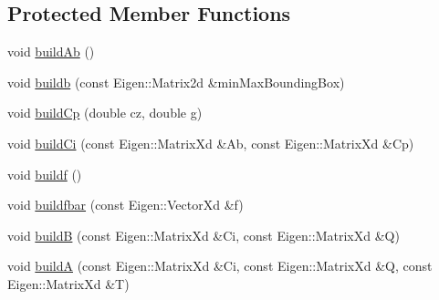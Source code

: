 \subsection*{\-Protected \-Member \-Functions}
\begin{DoxyCompactItemize}
\item 
void \hyperlink{classBaseOfSupport_a70bb139aba387291e0180458a53fb8e5}{build\-Ab} ()
\item 
void \hyperlink{classBaseOfSupport_a2a506dc1978a2f4ff459d521733b4367}{buildb} (const \-Eigen\-::\-Matrix2d \&min\-Max\-Bounding\-Box)
\item 
void \hyperlink{classBaseOfSupport_a7efc6cad789632e88d8c85ab171a9eef}{build\-Cp} (double cz, double g)
\item 
void \hyperlink{classBaseOfSupport_a1c9e19126fd1092462209ce9a3455cea}{build\-Ci} (const \-Eigen\-::\-Matrix\-Xd \&\-Ab, const \-Eigen\-::\-Matrix\-Xd \&\-Cp)
\item 
void \hyperlink{classBaseOfSupport_af5bb488bb7004a8b14dd0617c4c27700}{buildf} ()
\item 
void \hyperlink{classBaseOfSupport_abf35dd9826a8aa7f419ca008df21bdb7}{buildfbar} (const \-Eigen\-::\-Vector\-Xd \&f)
\item 
void \hyperlink{classBaseOfSupport_a10bedabffadd02423ff84184dbcfebb4}{build\-B} (const \-Eigen\-::\-Matrix\-Xd \&\-Ci, const \-Eigen\-::\-Matrix\-Xd \&\-Q)
\item 
void \hyperlink{classBaseOfSupport_ab0a2eb399e02b43872d2917c683d6a08}{build\-A} (const \-Eigen\-::\-Matrix\-Xd \&\-Ci, const \-Eigen\-::\-Matrix\-Xd \&\-Q, const \-Eigen\-::\-Matrix\-Xd \&\-T)
\end{DoxyCompactItemize}
